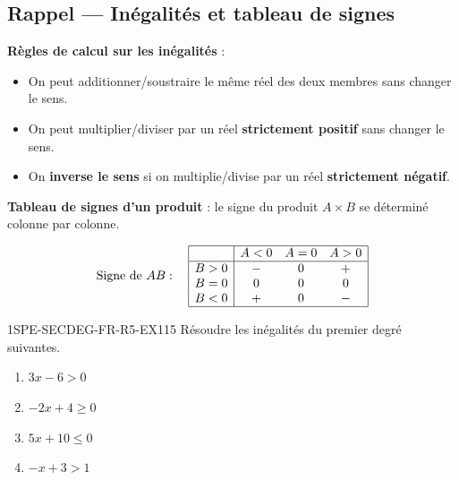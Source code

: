 

\subsection*{Rappel — Inégalités et tableau de signes}

\textbf{Règles de calcul sur les inégalités} :
\begin{itemize}
  \item On peut additionner/soustraire le même réel des deux membres sans changer le sens.
  \item On peut multiplier/diviser par un réel \textbf{strictement positif} sans changer le sens.
  \item On \textbf{inverse le sens} si on multiplie/divise par un réel \textbf{strictement négatif}.
\end{itemize}

\textbf{Tableau de signes d'un produit} : le signe du produit $A \times B$ se déterminé colonne par colonne.

\[
\text{Signe de } AB : \quad
\begin{array}{|c|ccc|}
\hline
 & A < 0 & A = 0 & A > 0 \\
\hline
B > 0 & - & 0 & + \\
B = 0 & 0 & 0 & 0 \\
B < 0 & + & 0 & - \\
\hline
\end{array}
\]


\begin{exercice}{1SPE-SECDEG-FR-R5-EX1}{1}{5}
Résoudre les inégalités du premier degré suivantes.
\begin{enumerate}
  \item $3x - 6 > 0$
  \item $-2x + 4 \geq 0$
  \item $5x + 10 \leq 0$
  \item $-x + 3 > 1$
\end{enumerate}
\end{exercice}

